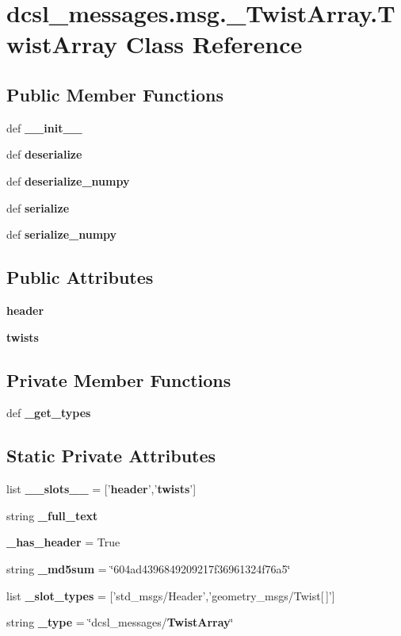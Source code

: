 \section{dcsl\-\_\-messages.\-msg.\-\_\-\-Twist\-Array.\-Twist\-Array \-Class \-Reference}
\label{classdcsl__messages_1_1msg_1_1__TwistArray_1_1TwistArray}
\subsection*{\-Public \-Member \-Functions}
\begin{DoxyCompactItemize}
\item 
def {\bf \-\_\-\-\_\-init\-\_\-\-\_\-}
\item 
def {\bf deserialize}
\item 
def {\bf deserialize\-\_\-numpy}
\item 
def {\bf serialize}
\item 
def {\bf serialize\-\_\-numpy}
\end{DoxyCompactItemize}
\subsection*{\-Public \-Attributes}
\begin{DoxyCompactItemize}
\item 
{\bf header}
\item 
{\bf twists}
\end{DoxyCompactItemize}
\subsection*{\-Private \-Member \-Functions}
\begin{DoxyCompactItemize}
\item 
def {\bf \-\_\-get\-\_\-types}
\end{DoxyCompactItemize}
\subsection*{\-Static \-Private \-Attributes}
\begin{DoxyCompactItemize}
\item 
list {\bf \-\_\-\-\_\-slots\-\_\-\-\_\-} = ['{\bf header}','{\bf twists}']
\item 
string {\bf \-\_\-full\-\_\-text}
\item 
{\bf \-\_\-has\-\_\-header} = \-True
\item 
string {\bf \-\_\-md5sum} = \char`\"{}604ad4396849209217f36961324f76a5\char`\"{}
\item 
list {\bf \-\_\-slot\-\_\-types} = ['std\-\_\-msgs/\-Header','geometry\-\_\-msgs/\-Twist[$\,$]']
\item 
string {\bf \-\_\-type} = \char`\"{}dcsl\-\_\-messages/{\bf \-Twist\-Array}\char`\"{}
\end{DoxyCompactItemize}



